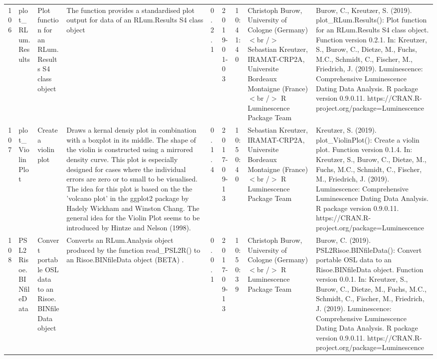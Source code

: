 \begin{table}[ht]
\begin{tabular}{rllllllll}
 \\ 
  106 & plot\_RLum.Results & Plot function for an RLum.Results S4 class object & The function provides a standardised plot output for data of an RLum.Results S4 class object & 0.2.1 & 2019-01-03 & 10:41:40
 & Christoph Burow, University of Cologne (Germany)  $<$br /$>$ Sebastian Kreutzer, IRAMAT-CRP2A, Universite Bordeaux Montaigne (France)$<$br /$>$  R Luminescence Package Team & Burow, C., Kreutzer, S. (2019). plot\_RLum.Results(): Plot function for an RLum.Results S4 class object. Function version 0.2.1. In: Kreutzer, S., Burow, C., Dietze, M., Fuchs, M.C., Schmidt, C., Fischer, M., Friedrich, J. (2019). Luminescence: Comprehensive Luminescence Dating Data Analysis. R package version 0.9.0.11. https://CRAN.R-project.org/package=Luminescence
 \\ 
  107 & plot\_ViolinPlot & Create a violin plot & Draws a kernal densiy plot in combination with a boxplot in its middle. The shape of the violin is constructed using a mirrored density curve. This plot is especially designed for cases where the individual errors are zero or to small to be visualised. The idea for this plot is based on the the 'volcano plot' in the ggplot2 package by Hadely Wickham and Winston Chang. The general idea for the Violin Plot seems to be introduced by Hintze and Nelson (1998). & 0.1.4 & 2017-09-13 & 10:50:40
 & Sebastian Kreutzer, IRAMAT-CRP2A, Universite Bordeaux Montaigne (France)$<$br /$>$  R Luminescence Package Team & Kreutzer, S. (2019). plot\_ViolinPlot(): Create a violin plot. Function version 0.1.4. In: Kreutzer, S., Burow, C., Dietze, M., Fuchs, M.C., Schmidt, C., Fischer, M., Friedrich, J. (2019). Luminescence: Comprehensive Luminescence Dating Data Analysis. R package version 0.9.0.11. https://CRAN.R-project.org/package=Luminescence
 \\ 
  108 & PSL2Risoe.BINfileData & Convert portable OSL data to an Risoe.BINfileData object & Converts an  RLum.Analysis  object produced by the function  read\_PSL2R()  to an  Risoe.BINfileData  object  (BETA) . & 0.0.1 & 2017-09-13 & 10:50:39
 & Christoph Burow, University of Cologne (Germany)$<$br /$>$  R Luminescence Package Team & Burow, C. (2019). PSL2Risoe.BINfileData(): Convert portable OSL data to an Risoe.BINfileData object. Function version 0.0.1. In: Kreutzer, S., Burow, C., Dietze, M., Fuchs, M.C., Schmidt, C., Fischer, M., Friedrich, J. (2019). Luminescence: Comprehensive Luminescence Dating Data Analysis. R package version 0.9.0.11. https://CRAN.R-project.org/package=Luminescence
 \\ 

\end{tabular}
\end{table}

